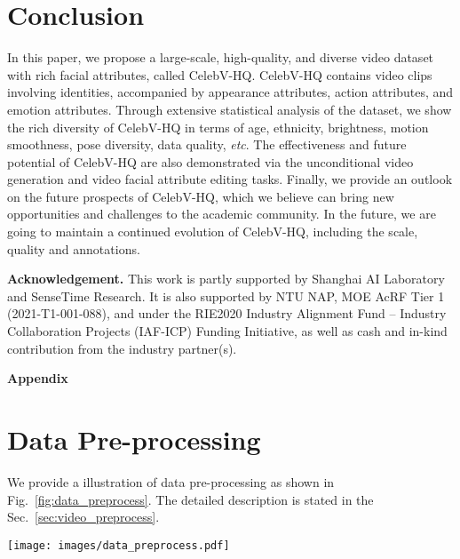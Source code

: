 \documentclass[runningheads]{llncs}
\begin{document}
\section{Conclusion}

In this paper, we propose a large-scale, high-quality, and diverse video dataset with rich facial attributes, called CelebV-HQ. CelebV-HQ contains  video clips involving  identities, accompanied by  appearance attributes,  action attributes, and  emotion attributes.
Through extensive statistical analysis of the dataset, we show the rich diversity of CelebV-HQ in terms of age, ethnicity, brightness, motion smoothness, pose diversity, data quality, \textit{etc}.
The effectiveness and future potential of CelebV-HQ are also demonstrated via the unconditional video generation and video facial attribute editing tasks. 
Finally, we provide an outlook on the future prospects of CelebV-HQ, which we believe can bring new opportunities and challenges to the academic community. In the future, we are going to maintain a continued evolution of CelebV-HQ, including the scale, quality and annotations.

\noindent
\textbf{Acknowledgement.} This work is partly supported by Shanghai AI Laboratory and SenseTime Research. It is also supported by NTU NAP, MOE AcRF Tier 1 (2021-T1-001-088), and under the RIE2020 Industry Alignment Fund – Industry Collaboration Projects (IAF-ICP) Funding Initiative, as well as cash and in-kind contribution from the industry partner(s).


{\small


}



\clearpage
\appendix


\noindent
\textbf{\LARGE Appendix}


\setcounter{table}{0}
\renewcommand{\thetable}{A\arabic{table}}
\setcounter{figure}{0}
\renewcommand{\thefigure}{A\arabic{figure}}



\section{Data Pre-processing}
\label{appsec:video_preprocess}
We provide a illustration of data pre-processing as shown in Fig.~\ref{fig:data_preprocess}. The detailed description is stated in the Sec.~\ref{sec:video_preprocess}. 

\begin{figure*}[h]
\centering
\texttt{[image: images/data\_preprocess.pdf]}
\caption{\textbf{Pipeline of data pre-process} (a) We start from the bounding box detection for each frame. (b) A tracking framework~\cite{sort} is introduced to track different identities. (c) Given bounding box sequences (\textcolor{orange}{dotted orange boxes}), we calculate their minimum bounding rectangles (\textcolor{blue}{blue box}). If bounding rectangles smaller than 512512, we expand it to this size (\textcolor{red}{red box}). (d) Finally, the videos are cropped using the bounding rectangles (blue/red boxes).  }
\label{fig:data_preprocess}
\end{figure*}
\end{document}
